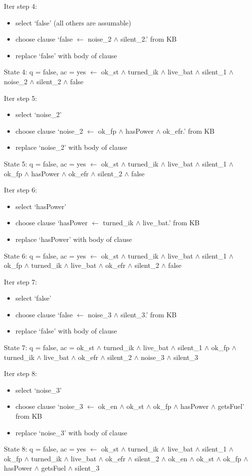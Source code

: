 \documentclass[]{article}
\begin{document}
Iter step 4: 
\begin{itemize}
  \item select `false' (all others are assumable) 
\item choose clause `false $\leftarrow$ noise\_2 $\wedge$ silent\_2.' from KB 
\item replace `false' with body of clause 
\end{itemize}
State 4: q = false, ac = yes $\leftarrow$ ok\_st $\wedge$ turned\_ik $\wedge$ live\_bat $\wedge$ silent\_1 $\wedge$ noise\_2 $\wedge$ silent\_2 $\wedge$ false 

Iter step 5: 
\begin{itemize}
  \item select `noise\_2' 
\item choose clause `noise\_2 $\leftarrow$ ok\_fp $\wedge$ hasPower $\wedge$ ok\_efr.' from KB 
\item replace `noise\_2' with body of clause 
\end{itemize}
State 5: q = false, ac = yes $\leftarrow$ ok\_st $\wedge$ turned\_ik $\wedge$ live\_bat $\wedge$ silent\_1 $\wedge$ ok\_fp $\wedge$ hasPower $\wedge$ ok\_efr $\wedge$ silent\_2 $\wedge$ false

Iter step 6: 
\begin{itemize}
  \item select `hasPower' 
\item choose clause `hasPower $\leftarrow$ turned\_ik $\wedge$ live\_bat.' from KB 
\item replace `hasPower' with body of clause
\end{itemize} 
State 6: q = false, ac = yes $\leftarrow$ ok\_st $\wedge$ turned\_ik $\wedge$ live\_bat $\wedge$ silent\_1 $\wedge$ ok\_fp $\wedge$ turned\_ik $\wedge$ live\_bat $\wedge$ ok\_efr $\wedge$ silent\_2 $\wedge$ false 

Iter step 7: 
\begin{itemize}
  \item select `false' 
\item choose clause `false $\leftarrow$ noise\_3 $\wedge$ silent\_3.' from KB 
\item replace `false' with body of clause 
\end{itemize}
State 7: q = false, ac = ok\_st $\wedge$ turned\_ik $\wedge$ live\_bat $\wedge$ silent\_1 $\wedge$ ok\_fp $\wedge$ turned\_ik $\wedge$ live\_bat $\wedge$ ok\_efr $\wedge$ silent\_2 $\wedge$ noise\_3 $\wedge$ silent\_3 

Iter step 8: 
\begin{itemize}
  \item select `noise\_3' 
\item choose clause `noise\_3 $\leftarrow$ ok\_en $\wedge$ ok\_st $\wedge$ ok\_fp $\wedge$ hasPower $\wedge$ getsFuel' from KB 
\item replace `noise\_3' with body of clause 
\end{itemize}
State 8: q = false, ac = yes $\leftarrow$ ok\_st $\wedge$ turned\_ik $\wedge$ live\_bat $\wedge$ silent\_1 $\wedge$ ok\_fp $\wedge$ turned\_ik $\wedge$ live\_bat $\wedge$ ok\_efr $\wedge$ silent\_2 $\wedge$ ok\_en $\wedge$ ok\_st $\wedge$ ok\_fp $\wedge$ hasPower $\wedge$ getsFuel $\wedge$ silent\_3 
\end{document}
